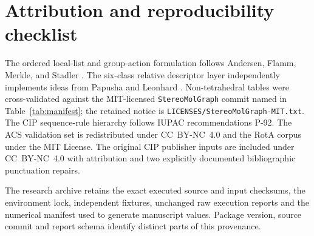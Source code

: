 \documentclass[pdflatex,sn-mathphys-num,referee,lineno]{sn-jnl}
\newcommand{\stereomolgraph}{\texttt{StereoMolGraph}\xspace}
\newcommand{\code}[1]{\texttt{#1}}
\theoremstyle{plain}
\theoremstyle{remark}
\theoremstyle{definition}
\begin{document}
\section{Attribution and reproducibility checklist}

The ordered local-list and group-action formulation follows Andersen, Flamm,
Merkle, and Stadler \cite{andersen2017stereo}.  The six-class relative
descriptor layer independently implements ideas from Papusha and Leonhard
\cite{papusha2026stereomolgraph}.  Non-tetrahedral tables were cross-validated against the MIT-licensed
\stereomolgraph commit named in Table~\ref{tab:manifest}; the retained notice is
\code{LICENSES/StereoMolGraph-MIT.txt}.  The CIP sequence-rule hierarchy
follows IUPAC recommendations P-92.  The ACS validation set is redistributed
under CC~BY-NC~4.0 and the RotA corpus under the MIT License. The original
CIP publisher inputs are included under CC~BY-NC~4.0 with attribution and
two explicitly documented bibliographic punctuation repairs.

The research archive retains the exact executed source and input checksums,
the environment lock, independent fixtures, unchanged raw execution reports
and the numerical manifest used to generate manuscript values. Package version,
source commit and report schema identify distinct parts of this provenance.
\endgroup



\end{document}
